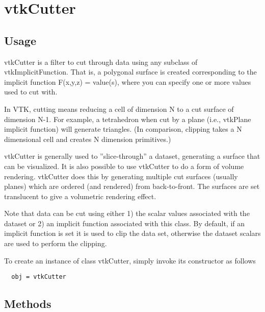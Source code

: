 \section{vtkCutter}

\subsection{Usage}

 vtkCutter is a filter to cut through data using any subclass of 
 vtkImplicitFunction. That is, a polygonal surface is created
 corresponding to the implicit function F(x,y,z) = value(s), where
 you can specify one or more values used to cut with.

 In VTK, cutting means reducing a cell of dimension N to a cut surface
 of dimension N-1. For example, a tetrahedron when cut by a plane (i.e.,
 vtkPlane implicit function) will generate triangles. (In comparison,
 clipping takes a N dimensional cell and creates N dimension primitives.)

 vtkCutter is generally used to ''slice-through'' a dataset, generating
 a surface that can be visualized. It is also possible to use vtkCutter
 to do a form of volume rendering. vtkCutter does this by generating
 multiple cut surfaces (usually planes) which are ordered (and rendered)
 from back-to-front. The surfaces are set translucent to give a 
 volumetric rendering effect.

 Note that data can be cut using either 1) the scalar values associated
 with the dataset or 2) an implicit function associated with this class.
 By default, if an implicit function is set it is used to clip the data
 set, otherwise the dataset scalars are used to perform the clipping.

To create an instance of class vtkCutter, simply
invoke its constructor as follows
\begin{verbatim}
  obj = vtkCutter
\end{verbatim}
\subsection{Methods}


